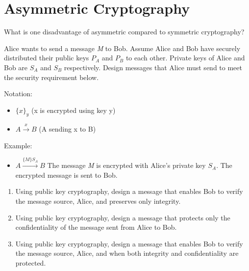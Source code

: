 \newpage
\section{Asymmetric Cryptography}

 {What is one disadvantage of asymmetric compared to symmetric cryptography?}\eprob
\vspace*{0.5in}


Alice wants to send a message \textit{M} to Bob. Assume Alice and Bob
have securely distributed their public keys $P_A$ and $P_B$ to
each other. Private keys of Alice and Bob are $S_A$ and $S_B$
respectively. Design messages that Alice must send to meet the security
requirement below.

Notation: 
\begin{itemize}
\item $\{x\}_y$ (x is encrypted using key y) 
\item $A \xrightarrow{x} B$ (A sending x to B)
\end{itemize}

Example:
\begin{itemize}
\item $A \xrightarrow{\{M\}{S_A}} B$ The message
  \textit{M} is encrypted with Alice's private
  key $S_A$. The encrypted message is sent to Bob.
\end{itemize}

\begin{enumerate}

\item Using public key cryptography, design a message that enables Bob to
verify the message source, Alice, and preserves only integrity.


\item Using public key cryptography, design a message that protects only the
confidentiality of the message sent from Alice to Bob.

\item Using public key cryptography, design a message that enables Bob to
verify the message source, Alice, and when both integrity and
confidentiality are protected.

\end{enumerate}
\eprob





